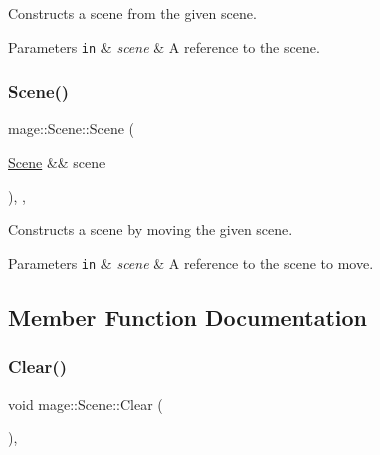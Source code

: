 Constructs a scene from the given scene.


\begin{DoxyParams}[1]{Parameters}
\mbox{\tt in}  & {\em scene} & A reference to the scene. \\
\hline
\end{DoxyParams}
\mbox{\label{classmage_1_1_scene_afeae10a3a50bf1d624faa6bd0bf33a7d}} 
\subsubsection{\texorpdfstring{Scene()}{Scene()}\hspace{0.1cm}{\footnotesize\ttfamily [3/3]}}
{\footnotesize\ttfamily mage\+::\+Scene\+::\+Scene (\begin{DoxyParamCaption}\item[{\mbox{\hyperlink{classmage_1_1_scene}{Scene}} \&\&}]{scene }\end{DoxyParamCaption})\hspace{0.3cm}{\ttfamily [protected]}, {\ttfamily [default]}, {\ttfamily [noexcept]}}

Constructs a scene by moving the given scene.


\begin{DoxyParams}[1]{Parameters}
\mbox{\tt in}  & {\em scene} & A reference to the scene to move. \\
\hline
\end{DoxyParams}


\subsection{Member Function Documentation}
\mbox{\label{classmage_1_1_scene_adf4a5b3885e34336caa5f145f55e01e1}} 
\subsubsection{\texorpdfstring{Clear()}{Clear()}}
{\footnotesize\ttfamily void mage\+::\+Scene\+::\+Clear (\begin{DoxyParamCaption}{ }\end{DoxyParamCaption})\hspace{0.3cm}{\ttfamily [private]}, {\ttfamily [noexcept]}}

